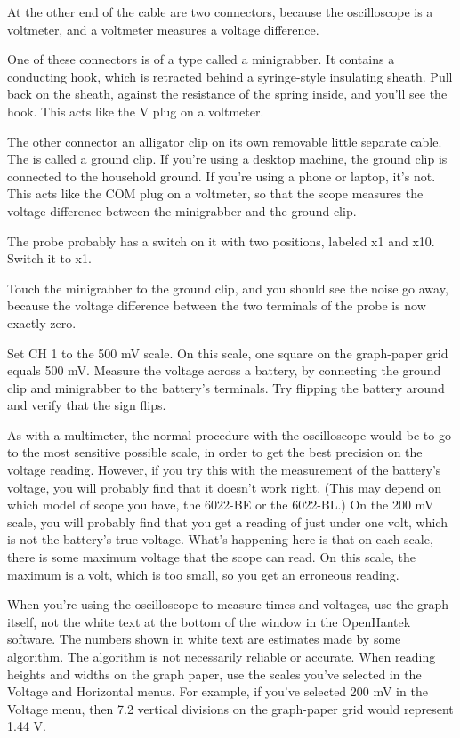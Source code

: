 At the other end of the cable are two
connectors, because the oscilloscope is a voltmeter, and a voltmeter measures
a voltage difference.

One of these connectors is of a type called a minigrabber.  It
contains a conducting hook, which is retracted behind a syringe-style
insulating sheath. Pull back on the sheath, against the resistance of
the spring inside, and you'll see the hook.  This acts like the V plug
on a voltmeter.

The other connector an alligator clip on its own removable little separate cable. The is called a ground
clip. If you're using a desktop machine, the ground clip
is connected to the household ground. If you're using a phone or laptop, it's not.
This acts like the COM plug on a voltmeter, so that the scope measures the voltage
difference between the minigrabber and the ground clip.

The probe probably has a switch on it with two positions, labeled x1 and x10.
Switch it to x1.

Touch the minigrabber to the ground clip, and you should see the noise go
away, because the voltage difference between the two terminals of the probe is now exactly zero.

Set CH 1 to the 500 mV scale. On this scale, one square on the
graph-paper grid equals 500 mV. Measure the voltage across a battery,
by connecting the ground clip and minigrabber to the battery's
terminals. Try flipping the battery around and verify that the sign
flips.

As with a multimeter, the normal procedure with the oscilloscope would be
to go to the most sensitive possible scale, in order to get the best precision
on the voltage reading. However, if you try this with the measurement of the battery's voltage,
you will probably find that it doesn't work right. (This may depend on which model of scope
you have, the 6022-BE or the 6022-BL.) On the 200 mV scale, you will probably find that
you get a reading of just under one volt, which is not the battery's true voltage.
What's happening here is that on each scale, there is some maximum voltage that the
scope can read. On this scale, the maximum is a volt, which is too small, so you get
an erroneous reading.

When you're using the oscilloscope to measure times and	voltages, use
the graph itself, not the white text at the bottom of the window in
the OpenHantek software. The numbers shown in white text are estimates made by some
algorithm. The algorithm is not necessarily reliable or accurate. When
reading heights and widths on the graph paper, use the scales you've
selected in the Voltage and Horizontal menus. For example, if you've
selected 200 mV in the Voltage menu, then 7.2 vertical divisions on
the graph-paper grid would represent 1.44 V.

